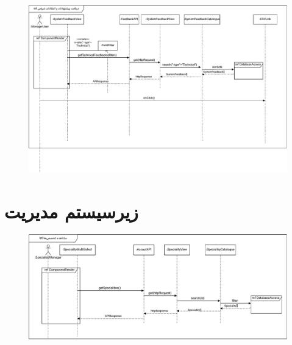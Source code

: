 \FloatBarrier
\newpage

\eject \pdfpagewidth=11in \pdfpageheight=9in

\begin{figure}[ht!]
	\centering
	\includegraphics[scale=0.8]{figs/design-sequence/3-41.pdf}
\end{figure}

\FloatBarrier
\newpage

\section{زیرسیستم مدیریت}

\eject \pdfpagewidth=11in \pdfpageheight=9in

\begin{figure}[ht!]
	\centering
	\includegraphics[scale=0.8]{figs/design-sequence/3-19.pdf}
\end{figure}

\FloatBarrier
\newpage

\eject \pdfpagewidth=15in \pdfpageheight=11in


